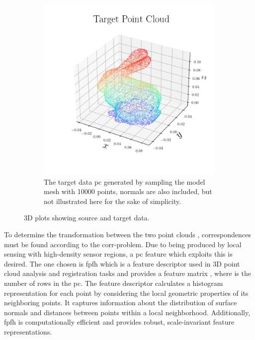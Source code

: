\begin{figure}[!h]
\begin{subfigure}[b]{0.48\textwidth}
		\includegraphics[width=\textwidth]{chapters/1-tactile-perception/fig/matplotlib/pc_target.png}
		\caption{The target data  \gls{pc} generated by sampling the model mesh with \num{10 000} points, normals are also included, but not illustrated here for the sake of simplicity.}
		\label{fig:pe-pc-target}
	\end{subfigure}
	\caption{3D plots showing source and target data.}
	\label{fig:pe-contact-position-gazebo}
\end{figure}

To determine the transformation between the two point clouds , correspondences must be found according to the \gls{corr-problem}. Due to  being produced by local sensing with high-density sensor regions, a \gls{pc} feature which exploits this is desired. The one chosen is \gls{fpfh} which is a feature descriptor used in 3D point cloud analysis and registration tasks and provides a feature matrix , where  is the number of rows in the \gls{pc}. The feature descriptor calculates a histogram representation for each point by considering the local geometric properties of its neighboring points. It captures information about the distribution of surface normals and distances between points within a local neighborhood. Additionally, \gls{fpfh} is computationally efficient and provides robust, scale-invariant feature representations. \medskip

